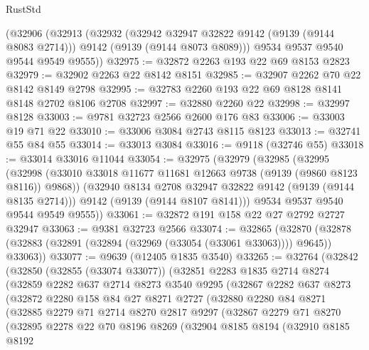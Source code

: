 \begin{lexlean}{RustStd}
\begin{coremodule}
    (@32906
      (@32913
        (@32932
          (@32942 @32947 @32822 @9142 (@9139 (@9144 @8083 @2714)))
          @9142
          (@9139 (@9144 @8073 @8089)))
        @9534
        @9537
        @9540
        @9544
        @9549
        @9555))
@32975 := @32872 @2263 @193 @22 @69 @8153 @2823
@32979 := @32902 @2263 @22 @8142 @8151
@32985 := @32907 @2262 @70 @22 @8142 @8149 @2798
@32995 := @32783 @2260 @193 @22 @69 @8128 @8141 @8148 @2702 @8106 @2708
@32997 := @32880 @2260 @22
@32998 := @32997 @8128
@33003 := @9781 @32723 @2566 @2600 @176 @83
@33006 := @33003 @19 @71 @22
@33010 := @33006 @3084 @2743 @8115 @8123
@33013 := @32741 @55 @84 @55
@33014 := @33013 @3084
@33016 := @9118 (@32746 @55)
@33018 := @33014 @33016 @11044
@33054 := @32975
    (@32979
      (@32985
        (@32995
          (@32998 (@33010 @33018 @11677 @11681 @12663 @9738 (@9139 (@9860 @8123 @8116)) @9868))
          (@32940 @8134 @2708 @32947 @32822 @9142 (@9139 (@9144 @8135 @2714)))
          @9142
          (@9139 (@9144 @8107 @8141)))
        @9534
        @9537
        @9540
        @9544
        @9549
        @9555))
@33061 := @32872 @191 @158 @22 @27 @2792 @2727 @32947
@33063 := @9381 @32723 @2566
@33074 := @32865
    (@32870 (@32878 (@32883 (@32891 (@32894 (@32969 (@33054 (@33061 @33063)))) @9645)) @33063))
@33077 := @9639 (@12405 @1835 @3540)
@33265 := @32764
    (@32842
      (@32850
        (@32855 (@33074 @33077))
        (@32851
          @2283
          @1835
          @2714
          @8274
          (@32859
            @2282
            @637
            @2714
            @8273
            @3540
            @9295
            (@32867
              @2282
              @637
              @8273
              (@32872
                @2280
                @158
                @84
                @27
                @8271
                @2727
                (@32880
                  @2280
                  @84
                  @8271
                  (@32885
                    @2279
                    @71
                    @2714
                    @8270
                    @2817
                    @9297
                    (@32867
                      @2279
                      @71
                      @8270
                      (@32895
                        @2278
                        @22
                        @70
                        @8196
                        @8269
                        (@32904
                          @8185
                          @8194
                          (@32910
                            @8185
                            @8192

\end{coremodule}
\end{lexlean}
